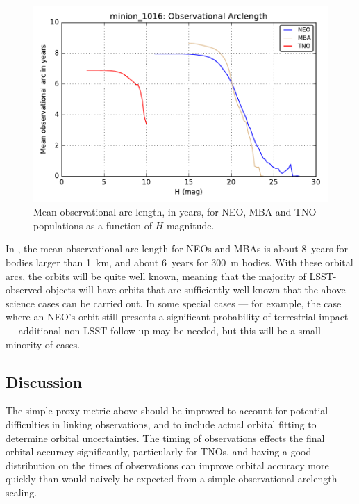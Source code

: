 \begin{figure}
\includegraphics[width=6in]{figs/solarsystem/minion_1016_ObsArc_neo_tno_mba_MOOB_ComboMetricVsH}
\caption{Mean observational arc length, in years, for NEO, MBA and TNO
  populations as a function of $H$ magnitude.
\label{obsarc}}
\end{figure}

In , the mean observational arc length for
NEOs and MBAs is about 8~years for bodies larger than 1~km, and about
6~years for 300~m bodies. With these
orbital arcs, the orbits will be quite well known,
meaning that the majority
of LSST-observed objects will have orbits that are sufficiently
well known that the above science cases can be carried out.
In some special cases --- for example, the case where
an NEO's orbit still presents a significant probability
of terrestrial impact --- additional non-LSST follow-up
may be needed, but this will be a small minority of cases.



\subsection{Discussion}
\label{sec:\secname:discussion}

The simple proxy metric above should be improved to account for
potential difficulties in linking observations, and to include actual
orbital fitting to determine orbital uncertainties. The timing of
observations effects the final orbital accuracy significantly,
particularly for TNOs, and having a good distribution on the times of
observations can improve orbital accuracy more quickly than would
naively be expected from a simple observational arclength scaling.

